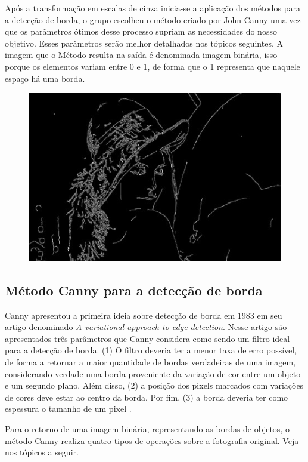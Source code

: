 \documentclass[12pt]{article}
\begin{document}
	
	
		
	Após a transformação em escalas de cinza inicia-se a aplicação dos métodos para a detecção de borda, o grupo escolheu o método criado por John Canny uma vez que os parâmetros ótimos desse processo supriam as necessidades do nosso objetivo.  Esses parâmetros serão melhor detalhados nos tópicos seguintes. A imagem que o Método resulta na saída é denominada imagem binária, isso porque os elementos variam entre 0 e 1, de forma que o 1 representa que naquele espaço há uma borda.
	
	\begin{figure}[h!]
		\centering
		\includegraphics[width=0.7\linewidth]{img/img9}
		\caption{}
		\label{fig:img9}
	\end{figure}
	
	
	\subsection{Método Canny para a detecção de borda}
	Canny apresentou a primeira ideia sobre detecção de borda em 1983 em seu artigo denominado \textit{A variational approach to edge detection}. Nesse artigo são apresentados três parâmetros que Canny considera como sendo um filtro ideal para a detecção de borda. (1) O filtro deveria ter a menor taxa de erro possível, de forma a retornar a maior quantidade de bordas verdadeiras de uma imagem, considerando verdade uma borda proveniente da variação de cor entre um objeto e um segundo plano. Além disso, (2) a posição dos pixels marcados com variações de cores deve estar ao centro da borda. Por fim, (3) a borda deveria ter como espessura o tamanho de um pixel \citep{canny1983variational}. 
	
	Para o retorno de uma imagem binária, representando as bordas de objetos, o método Canny realiza quatro tipos de operações sobre a fotografia original. Veja nos tópicos a seguir.  
	
\end{document}

